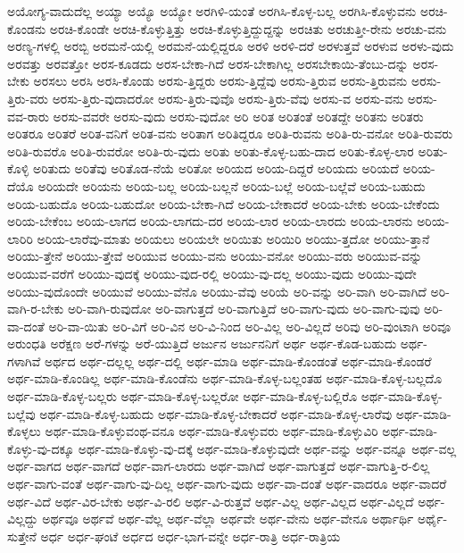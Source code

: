 {ಅಯೋಗ್ಯ-ವಾದುದೆಲ್ಲ
ಅಯ್ಯಾ
ಅಯ್ಯೊ
ಅಯ್ಯೋ
ಅರಗಿಳಿ-ಯಂತೆ
ಅರಗಿಸಿ-ಕೊಳ್ಳ-ಬಲ್ಲ
ಅರಗಿಸಿ-ಕೊಳ್ಳುವನು
ಅರಚಿ-ಕೊಂಡನು
ಅರಚಿ-ಕೊಂಡೇ
ಅರಚಿ-ಕೊಳ್ಳುತ್ತಿತ್ತು
ಅರಚಿ-ಕೊಳ್ಳುತ್ತಿದ್ದುದ್ದನ್ನು
ಅರಚಿತು
ಅರಚುತ್ತೀ-ರೇನು
ಅರಚು-ವನು
ಅರಣ್ಯ-ಗಳಲ್ಲಿ
ಅರಬ್ಬಿ
ಅರಮನೆ-ಯಲ್ಲಿ
ಅರಮನೆ-ಯಲ್ಲಿದ್ದರೂ
ಅರಳಿ
ಅರಳಿ-ದರೆ
ಅರಳುತ್ತವೆ
ಅರಳುವ
ಅರಳು-ವುದು
ಅರವತ್ತು
ಅರವತ್ತೋ
ಅರಸ-ಕೂಡದು
ಅರಸ-ಬೇಕಾ-ಗಿದೆ
ಅರಸ-ಬೇಕಾಗಿಲ್ಲ
ಅರಸಬೇಕಾಯಿ-ತೆಂಬು-ದನ್ನು
ಅರಸ-ಬೇಕು
ಅರಸಲು
ಅರಸಿ
ಅರಸಿ-ಕೊಂಡು
ಅರಸು-ತ್ತಿದ್ದರು
ಅರಸು-ತ್ತಿದ್ದೆವು
ಅರಸು-ತ್ತಿರುವ
ಅರಸು-ತ್ತಿರುವನು
ಅರಸು-ತ್ತಿರು-ವರು
ಅರಸು-ತ್ತಿರು-ವುದಾದರೋ
ಅರಸು-ತ್ತಿರು-ವುವೊ
ಅರಸು-ತ್ತಿರು-ವೆವು
ಅರಸು-ವ
ಅರಸು-ವನು
ಅರಸು-ವವ-ರಾರು
ಅರಸು-ವವರೇ
ಅರಸು-ವುದು
ಅರಸು-ವುದೋ
ಅರಿ
ಅರಿತ
ಅರಿತಂತೆ
ಅರಿತದ್ದೇ
ಅರಿತನು
ಅರಿತರು
ಅರಿತರೂ
ಅರಿತರೆ
ಅರಿತ-ವನಿಗೆ
ಅರಿತ-ವನು
ಅರಿತಾಗ
ಅರಿತಿದ್ದರೂ
ಅರಿತಿ-ರುವನು
ಅರಿತಿ-ರು-ವನೋ
ಅರಿತಿ-ರುವರು
ಅರಿತಿ-ರುವರೊ
ಅರಿತಿ-ರುವರೋ
ಅರಿತಿ-ರು-ವುದು
ಅರಿತು
ಅರಿತು-ಕೊಳ್ಳ-ಬಹು-ದಾದ
ಅರಿತು-ಕೊಳ್ಳ-ಲಾರ
ಅರಿತು-ಕೊಳ್ಳಿ
ಅರಿತುದು
ಅರಿತೆವು
ಅರಿತೊಡ-ನೆಯೆ
ಅರಿತೋ
ಅರಿಯದ
ಅರಿಯ-ದಿದ್ದರೆ
ಅರಿಯದು
ಅರಿಯದೆ
ಅರಿಯ-ದೆಯೊ
ಅರಿಯದೇ
ಅರಿಯನು
ಅರಿಯ-ಬಲ್ಲ
ಅರಿಯ-ಬಲ್ಲನೆ
ಅರಿಯ-ಬಲ್ಲೆ
ಅರಿಯ-ಬಲ್ಲೆವೆ
ಅರಿಯ-ಬಹುದು
ಅರಿಯ-ಬಹುದೊ
ಅರಿಯ-ಬಹುದೋ
ಅರಿಯ-ಬೇಕಾ-ಗಿದೆ
ಅರಿಯ-ಬೇಕಾದರೆ
ಅರಿಯ-ಬೇಕು
ಅರಿಯ-ಬೇಕೆಂದು
ಅರಿಯ-ಬೇಕೆಂಬ
ಅರಿಯ-ಲಾಗದ
ಅರಿಯ-ಲಾಗದು-ದರ
ಅರಿಯ-ಲಾರ
ಅರಿಯ-ಲಾರದು
ಅರಿಯ-ಲಾರನು
ಅರಿಯ-ಲಾರಿರಿ
ಅರಿಯ-ಲಾರೆವು-ಮಾತು
ಅರಿಯಲು
ಅರಿಯಲೇ
ಅರಿಯಿತು
ಅರಿಯಿರಿ
ಅರಿಯು-ತ್ತದೋ
ಅರಿಯು-ತ್ತಾನೆ
ಅರಿಯು-ತ್ತೇನೆ
ಅರಿಯು-ತ್ತೇವೆ
ಅರಿಯುವ
ಅರಿಯು-ವನು
ಅರಿಯು-ವನೋ
ಅರಿಯು-ವರು
ಅರಿಯುವ-ವನ್ನು
ಅರಿಯುವ-ವರೆಗೆ
ಅರಿಯು-ವುದಕ್ಕೆ
ಅರಿಯು-ವುದ-ರಲ್ಲಿ
ಅರಿಯು-ವು-ದಲ್ಲ
ಅರಿಯು-ವುದು
ಅರಿಯು-ವುದೇ
ಅರಿಯು-ವುದೊಂದೇ
ಅರಿಯುವೆ
ಅರಿಯು-ವೆನೊ
ಅರಿಯು-ವೆವು
ಅರಿಯೆ
ಅರಿ-ವನ್ನು
ಅರಿ-ವಾಗಿ
ಅರಿ-ವಾಗಿದೆ
ಅರಿ-ವಾಗಿ-ರ-ಬೇಕು
ಅರಿ-ವಾಗಿ-ರುವುದೋ
ಅರಿ-ವಾಗುತ್ತದೆ
ಅರಿ-ವಾಗುತ್ತಿದೆ
ಅರಿ-ವಾಗು-ವುದು
ಅರಿ-ವಾಗು-ವುವು
ಅರಿ-ವಾ-ದಂತೆ
ಅರಿ-ವಾ-ಯಿತು
ಅರಿ-ವಿಗೆ
ಅರಿ-ವಿನ
ಅರಿ-ವಿ-ನಿಂದ
ಅರಿ-ವಿಲ್ಲ
ಅರಿ-ವಿಲ್ಲದೆ
ಅರಿವು
ಅರಿ-ವುಂಟಾಗಿ
ಅರಿವೂ
ಅರುಂಧತಿ
ಅರೆಕ್ಷಣ
ಅರೆ-ಗಳನ್ನು
ಅರೆ-ಯುತ್ತಿದೆ
ಅರ್ಜುನ
ಅರ್ಜುನನಿಗೆ
ಅರ್ಥ
ಅರ್ಥ-ಕೊಡ-ಬಹುದು
ಅರ್ಥ-ಗಳಾಗಿವೆ
ಅರ್ಥದ
ಅರ್ಥ-ದಲ್ಲಲ್ಲ
ಅರ್ಥ-ದಲ್ಲಿ
ಅರ್ಥ-ಮಾಡಿ
ಅರ್ಥ-ಮಾಡಿ-ಕೊಂಡಂತೆ
ಅರ್ಥ-ಮಾಡಿ-ಕೊಂಡರೆ
ಅರ್ಥ-ಮಾಡಿ-ಕೊಂಡಿಲ್ಲ
ಅರ್ಥ-ಮಾಡಿ-ಕೊಂಡೆನು
ಅರ್ಥ-ಮಾಡಿ-ಕೊಳ್ಳ-ಬಲ್ಲಂತಹ
ಅರ್ಥ-ಮಾಡಿ-ಕೊಳ್ಳ-ಬಲ್ಲದೊ
ಅರ್ಥ-ಮಾಡಿ-ಕೊಳ್ಳ-ಬಲ್ಲರು
ಅರ್ಥ-ಮಾಡಿ-ಕೊಳ್ಳ-ಬಲ್ಲರೋ
ಅರ್ಥ-ಮಾಡಿ-ಕೊಳ್ಳ-ಬಲ್ಲಿರೊ
ಅರ್ಥ-ಮಾಡಿ-ಕೊಳ್ಳ-ಬಲ್ಲೆವು
ಅರ್ಥ-ಮಾಡಿ-ಕೊಳ್ಳ-ಬಹುದು
ಅರ್ಥ-ಮಾಡಿ-ಕೊಳ್ಳ-ಬೇಕಾದರೆ
ಅರ್ಥ-ಮಾಡಿ-ಕೊಳ್ಳ-ಲಾರೆವು
ಅರ್ಥ-ಮಾಡಿ-ಕೊಳ್ಳಲು
ಅರ್ಥ-ಮಾಡಿ-ಕೊಳ್ಳುವಂಥ-ವನೂ
ಅರ್ಥ-ಮಾಡಿ-ಕೊಳ್ಳುವರು
ಅರ್ಥ-ಮಾಡಿ-ಕೊಳ್ಳುವಿರಿ
ಅರ್ಥ-ಮಾಡಿ-ಕೊಳ್ಳು-ವು-ದಕ್ಕೂ
ಅರ್ಥ-ಮಾಡಿ-ಕೊಳ್ಳು-ವು-ದಕ್ಕೆ
ಅರ್ಥ-ಮಾಡಿ-ಕೊಳ್ಳುವುದೇ
ಅರ್ಥ-ವನ್ನು
ಅರ್ಥ-ವನ್ನೂ
ಅರ್ಥ-ವಲ್ಲ
ಅರ್ಥ-ವಾಗದ
ಅರ್ಥ-ವಾಗದೆ
ಅರ್ಥ-ವಾಗ-ಲಾರದು
ಅರ್ಥ-ವಾಗಿದೆ
ಅರ್ಥ-ವಾಗುತ್ತದೆ
ಅರ್ಥ-ವಾಗುತ್ತಿ-ರ-ಲಿಲ್ಲ
ಅರ್ಥ-ವಾಗು-ವಂತೆ
ಅರ್ಥ-ವಾಗು-ವು-ದಿಲ್ಲ
ಅರ್ಥ-ವಾಗು-ವುದು
ಅರ್ಥ-ವಾ-ದಂತೆ
ಅರ್ಥ-ವಾದರೂ
ಅರ್ಥ-ವಾದರೆ
ಅರ್ಥ-ವಿದೆ
ಅರ್ಥ-ವಿರ-ಬೇಕು
ಅರ್ಥ-ವಿ-ರಲಿ
ಅರ್ಥ-ವಿ-ರುತ್ತವೆ
ಅರ್ಥ-ವಿಲ್ಲ
ಅರ್ಥ-ವಿಲ್ಲದ
ಅರ್ಥ-ವಿಲ್ಲದೆ
ಅರ್ಥ-ವಿಲ್ಲದ್ದು
ಅರ್ಥವೂ
ಅರ್ಥವೆ
ಅರ್ಥ-ವೆಲ್ಲ
ಅರ್ಥ-ವೆಲ್ಲಾ
ಅರ್ಥವೇ
ಅರ್ಥ-ವೇನು
ಅರ್ಥ-ವೇನೂ
ಅರ್ಥಾರ್ಥಿ
ಅರ್ಥೈ-ಸುತ್ತೇನೆ
ಅರ್ಧ
ಅರ್ಧ-ಘಂಟೆ
ಅರ್ಧದ
ಅರ್ಧ-ಭಾಗ-ವನ್ನೇ
ಅರ್ಧ-ರಾತ್ರಿ
ಅರ್ಧ-ರಾತ್ರಿಯ
}
